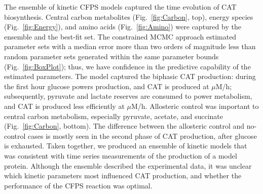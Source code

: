 \documentclass[12pt]{article}
\begin{document}
The ensemble of kinetic CFPS models captured the time evolution of CAT biosynthesis.
Central carbon metabolites (Fig.~\ref{fig:Carbon}, top), energy species (Fig.~\ref{fig:Energy}), and amino acids (Fig.~\ref{fig:Amino}) were captured by the ensemble and the best-fit set.
The constrained MCMC approach estimated parameter sets with a median error more than two orders of magnitude less than random parameter sets generated within the same parameter bounds (Fig.~\ref{fig:BoxPlot}); thus, we have confidence in the predictive capability of the estimated parameters.
The model captured the biphasic CAT production: during the first hour glucose powers production, and CAT is produced at  $\mu$M/h; subsequently, pyruvate and lactate reserves are consumed to power metabolism, and CAT is produced less efficiently at  $\mu$M/h.
Allosteric control was important to central carbon metabolism, especially pyruvate, acetate, and succinate (Fig.~\ref{fig:Carbon}, bottom).
The difference between the allosteric control and no-control cases is mostly seen in the second phase of CAT production, after glucose is exhausted.
Taken together, we produced an ensemble of kinetic models that was consistent with time series measurements of the production of a model protein.
Although the ensemble described the experimental data, it was unclear which kinetic parameters most influenced CAT production, and whether the performance of the CFPS reaction was optimal.
\end{document}
